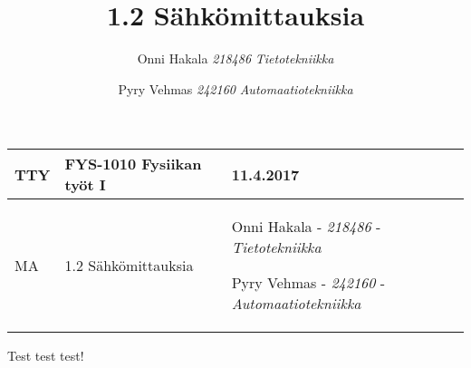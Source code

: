 \documentclass[]{article}
\title{1.2 Sähkömittauksia  }
\author{\Large Onni Hakala\vspace{0.05in} \newline\normalsize\emph{218486} \newline\normalsize\emph{Tietotekniikka}   \and \Large Pyry Vehmas\vspace{0.05in} \newline\normalsize\emph{242160} \newline\normalsize\emph{Automaatiotekniikka}  }
\date{}
\begin{document}
%
\pagestyle{empty}


\begin{center}
    \bgroup
    \renewcommand{\arraystretch}{2.0}
    \begin{tabular}{ | p{2.0cm} | p{5cm} | p{7cm} |}
    \hline
     TTY  &
     FYS-1010 Fysiikan työt I  &
     11.4.2017  \\ \hline
     MA  &
     1.2 Sähkömittauksia  &
    Onni Hakala - \emph{\small 218486} - \emph{\small Tietotekniikka}   \par Pyry Vehmas - \emph{\small 242160} - \emph{\small Automaatiotekniikka}    \\
    \hline
    \end{tabular}
    \egroup
\end{center}
\newpage

\pagestyle{plain}                       %
\setcounter{secnumdepth}{-1}            %

\linespread{1.2}                        %
\selectfont                             %

{
\hypersetup{linkcolor=black}
\setcounter{tocdepth}{2}
\tableofcontents
\newpage
}

\setcounter{secnumdepth}{2}            %
\linespread{1.3}                       %
\selectfont                            %



\vskip 6.5pt

\noindent  Test test test!
\end{document}
